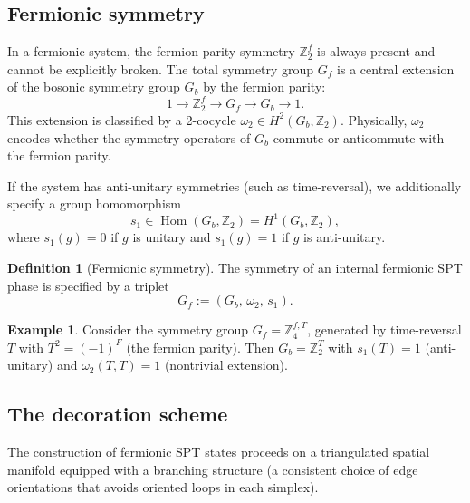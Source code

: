 \documentclass{SciPost}
\theoremstyle{definition}
\newtheorem{definition}[theorem]{Definition}
\newtheorem{example}[theorem]{Example}
\newcommand{\Zt}{\mathbb{Z}_2}
\newcommand{\Zn}[1]{\mathbb{Z}_{#1}}
\newcommand{\Gb}{G_b}
\newcommand{\Gf}{G_f}
\renewcommand{\Hom}{\operatorname{Hom}}
\begin{document}
\subsection{Fermionic symmetry}
\label{subsec:fermionic-symmetry}

In a fermionic system, the fermion parity symmetry $\Zt^f$ is always present and cannot be explicitly broken.
The total symmetry group $\Gf$ is a central extension of the bosonic symmetry group $\Gb$ by the fermion parity:
\begin{equation}
\label{eq:Gf-extension}
1 \longrightarrow \Zt^f \longrightarrow \Gf \longrightarrow \Gb \longrightarrow 1.
\end{equation}
This extension is classified by a 2-cocycle $\omega_2 \in H^2(\Gb, \Zt)$.
Physically, $\omega_2$ encodes whether the symmetry operators of $\Gb$ commute or anticommute with the fermion parity.

If the system has anti-unitary symmetries (such as time-reversal), we additionally specify a group homomorphism
\begin{equation}
\label{eq:s1}
s_1 \in \Hom(\Gb, \Zt) = H^1(\Gb, \Zt),
\end{equation}
where $s_1(g) = 0$ if $g$ is unitary and $s_1(g) = 1$ if $g$ is anti-unitary.

\begin{definition}[Fermionic symmetry]
The symmetry of an internal fermionic SPT phase is specified by a triplet
\begin{equation}
\Gf := (\Gb,\, \omega_2,\, s_1).
\end{equation}
\end{definition}

\begin{example}
Consider the symmetry group $\Gf = \Zn{4}^{f,T}$, generated by time-reversal $T$ with $T^2 = (-1)^F$ (the fermion parity).
Then $\Gb = \Zt^T$ with $s_1(T) = 1$ (anti-unitary) and $\omega_2(T, T) = 1$ (nontrivial extension).
\end{example}


\subsection{The decoration scheme}
\label{subsec:decoration-scheme}

The construction of fermionic SPT states proceeds on a triangulated spatial manifold equipped with a branching structure (a consistent choice of edge orientations that avoids oriented loops in each simplex).
\end{document}
